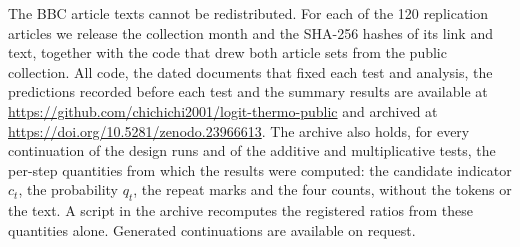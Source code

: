 \documentclass[aps,prx,onecolumn,superscriptaddress,longbibliography]{revtex4-2}
\begin{document}
The BBC article texts cannot be redistributed. For each of the 120 replication articles we release the collection month and the SHA-256 hashes of its link and text, together with the code that drew both article sets from the public collection. All code, the dated documents that fixed each test and analysis, the predictions recorded before each test and the summary results are available at \url{https://github.com/chichichi2001/logit-thermo-public} and archived at \url{https://doi.org/10.5281/zenodo.23966613}. The archive also holds, for every continuation of the design runs and of the additive and multiplicative tests, the per-step quantities from which the results were computed: the candidate indicator \(c_{t}\), the probability \(q_{t}\), the repeat marks and the four counts, without the tokens or the text. A script in the archive recomputes the registered ratios from these quantities alone. Generated continuations are available on request.


\end{document}

